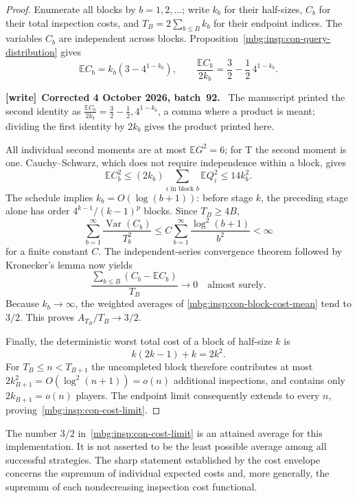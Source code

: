 \documentclass[11pt,letterpaper]{article}
\theoremstyle{definition}
\newcommand{\E}{\mathbb E}
\DeclareMathOperator{\Var}{Var}
\newenvironment{writenote}[1][]{\par\smallskip\begingroup\small
 \noindent\textbf{[write]}\if\relax\detokenize{#1}\relax\else~\textbf{#1.}\fi\ }%
 {\par\endgroup\smallskip}
\begin{document}
\begin{proof}
Enumerate all blocks by $b=1,2,\ldots$; write $k_b$ for their half-sizes,
$C_b$ for their total inspection costs, and
$T_B=2\sum_{b\leq B}k_b$ for their endpoint indices.  The variables $C_b$
are independent across blocks.  Proposition~\ref{mbg:insp:con-query-distribution}
gives
\begin{equation}\label{mbg:insp:con-block-cost-mean}
 \E C_b=k_b(3-4^{1-k_b}),
 \qquad
 \frac{\E C_b}{2k_b}=\frac32-\frac12\,4^{1-k_b}.
\end{equation}
\begin{writenote}[Corrected 4 October 2026, batch~92]
The manuscript printed the second identity as $\frac{\E C_b}{2k_b}=\frac32-\frac12,4^{1-k_b}$, a comma where a product is meant; dividing the first identity by $2k_b$ gives the product printed here.
\end{writenote}

All individual second moments are at most $\E G^2=6$; for T the second
moment is one.  Cauchy--Schwarz, which does not require independence within
a block, gives
\[
 \E C_b^2
 \leq (2k_b)\sum_{i\text{ in block }b}\E Q_i^2
 \leq14k_b^2.
\]
The schedule implies $k_b=O(\log(b+1))$: before stage $k$, the preceding
stage alone has order $4^{k-1}/(k-1)^p$ blocks.  Since $T_B\geq4B$,
\[
 \sum_{b=1}^{\infty}\frac{\Var(C_b)}{T_b^2}
 \leq C\sum_{b=1}^{\infty}\frac{\log^2(b+1)}{b^2}<\infty
\]
for a finite constant $C$.  The independent-series convergence theorem
followed by Kronecker's lemma now yields
\[
 \frac{\sum_{b\leq B}(C_b-\E C_b)}{T_B}\longrightarrow0
 \quad\text{almost surely}.
\]
Because $k_b\to\infty$, the weighted averages of
\eqref{mbg:insp:con-block-cost-mean} tend to $3/2$.  This proves
$A_{T_B}/T_B\to3/2$.

Finally, the deterministic worst total cost of a block of half-size $k$ is
\[
 k(2k-1)+k=2k^2.
\]
For $T_B\leq n<T_{B+1}$ the uncompleted block therefore contributes at most
$2k_{B+1}^2=O(\log^2(n+1))=o(n)$ additional inspections, and contains only
$2k_{B+1}=o(n)$ players.  The endpoint limit consequently extends to every
$n$, proving~\eqref{mbg:insp:con-cost-limit}.
\end{proof}

The number $3/2$ in~\eqref{mbg:insp:con-cost-limit} is an attained average for this
implementation.  It is not asserted to be the least possible average among
all successful strategies.  The sharp statement established by the cost
envelope concerns the supremum of individual expected costs and, more
generally, the supremum of each nondecreasing inspection cost functional.
\end{document}
